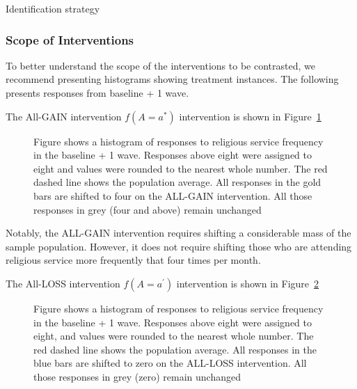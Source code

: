 \documentclass[
  singlecolumn]{article}
\begin{document}
\begin{table}

\caption{\label{tbl-identification}Identification strategy}

\centering{

\lmtptable

}

\end{table}%

\subsubsection{Scope of Interventions}\label{scope-of-interventions}

To better understand the scope of the interventions to be contrasted, we
recommend presenting histograms showing treatment instances. The
following presents responses from baseline + 1 wave.

The All-GAIN intervention \(f(A=a^*)\) intervention is shown in
Figure~\ref{fig-0up}

\begin{figure}


\caption{\label{fig-0up}Figure shows a histogram of responses to
religious service frequency in the baseline + 1 wave. Responses above
eight were assigned to eight and values were rounded to the nearest
whole number. The red dashed line shows the population average. All
responses in the gold bars are shifted to four on the ALL-GAIN
intervention. All those responses in grey (four and above) remain
unchanged}

\end{figure}%

Notably, the ALL-GAIN intervention requires shifting a considerable mass
of the sample population. However, it does not require shifting those
who are attending religious service more frequently that four times per
month.

The All-LOSS intervention \(f(A=a^\prime)\) intervention is shown in
Figure~\ref{fig-0down}

\begin{figure}


\caption{\label{fig-0down}Figure shows a histogram of responses to
religious service frequency in the baseline + 1 wave. Responses above
eight were assigned to eight, and values were rounded to the nearest
whole number. The red dashed line shows the population average. All
responses in the blue bars are shifted to zero on the ALL-LOSS
intervention. All those responses in grey (zero) remain unchanged}

\end{figure}%
\end{document}
